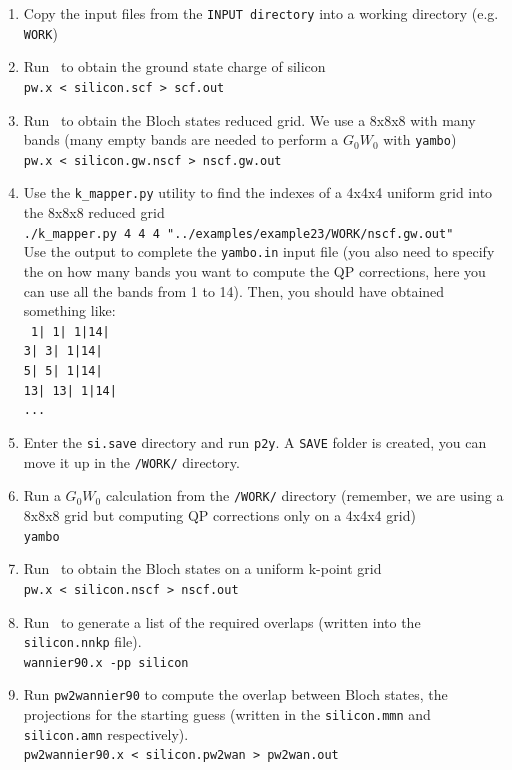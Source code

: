 \documentclass[a4paper,11pt,twoside]{article}
\begin{document}
\begin{enumerate}
\item Copy the input files from the {\tt INPUT directory} into a working directory (e.g. {\tt WORK})
\item Run \pwscf\ to obtain the ground state charge of silicon \\
{\tt pw.x < silicon.scf > scf.out}
\item Run \pwscf\ to obtain the Bloch states reduced grid. We use a 8x8x8 with many bands (many empty bands are needed to perform a $G_0W_0$ with {\tt yambo})\\
{\tt pw.x < silicon.gw.nscf > nscf.gw.out}
\item Use the {\tt k\_mapper.py} utility to find the indexes of a 4x4x4 uniform grid into the 8x8x8 reduced grid \\
{\tt ./k\_mapper.py 4 4 4 "../examples/example23/WORK/nscf.gw.out"}\\
Use the output to complete the {\tt yambo.in} input file (you also need to specify the on how many bands you want to compute the QP corrections, here you can use all the bands from 1 to 14). Then, you should have obtained something like:\\
 {\tt 
1| 1|  1|14| \\
3| 3|  1|14| \\ 
5| 5|  1|14| \\ 
13| 13|  1|14| \\
...\tt}
\item Enter the {\tt si.save} directory and run {\tt p2y}. A {\tt SAVE} folder is created, you can move it up in the {\tt /WORK/} directory.\\
\item Run a $G_0W_0$ calculation from the {\tt /WORK/} directory (remember, we are using a 8x8x8 grid but computing QP corrections only on a 4x4x4 grid)\\
{\tt yambo }


\item Run \pwscf\ to obtain the Bloch states on a uniform k-point grid\\
{\tt pw.x < silicon.nscf > nscf.out}

\item Run \wannier\ to generate a list of the required overlaps (written
  into the {\tt silicon.nnkp} file).\\ 
{\tt wannier90.x -pp silicon}

\item Run {\tt pw2wannier90} to compute the overlap between Bloch
  states, the projections for the starting guess (written in the
  {\tt silicon.mmn} and {\tt silicon.amn} respectively).\\  
{\tt pw2wannier90.x < silicon.pw2wan > pw2wan.out}


\end{enumerate}
\end{document}
